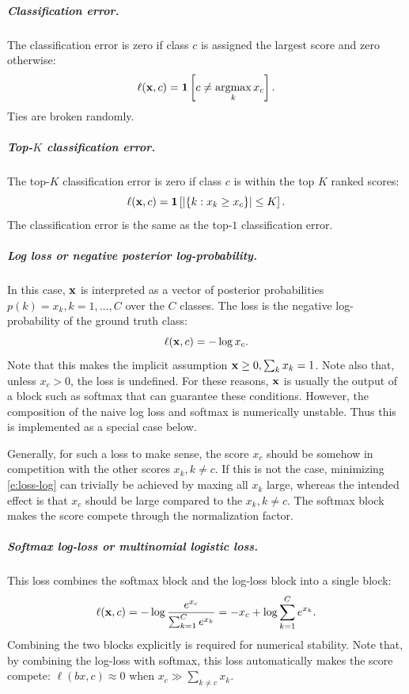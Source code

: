 \subparagraph{Classification error.} The classification error is zero if class $c$ is assigned the largest score and zero otherwise:
\begin{equation}\label{e:loss-classerror}
\ell(\bx,c) = \mathbf{1}\left[c \not= \argmax_k x_c\right].
\end{equation}
Ties are broken randomly.

\subparagraph{Top-$K$ classification error.} The top-$K$ classification error is zero if class $c$ is within the top $K$ ranked scores:
\begin{equation}\label{e:loss-classerror}
\ell(\mathbf{x},c) = \mathbf{1}\left[ |\{k : x_k \geq x_c \}| \leq K \right].
\end{equation}
The classification error is the same as the top-$1$ classification error.

\subparagraph{Log loss or negative posterior log-probability.} In this case, $\mathbf{x}$ is interpreted as a vector of posterior probabilities $p(k) = x_k, k=1,\dots, C$ over the $C$ classes. The loss is the negative log-probability of the ground truth class:
\begin{equation}\label{e:loss-log}
\ell(\mathbf{x}, c) = - \log x_c.
\end{equation}
Note that this makes the implicit assumption $\mathbf{x} \geq 0, \sum_k x_k = 1$. Note also that, unless $x_c > 0$, the loss is undefined. For these reasons, $\mathbf{x}$ is usually the output of a block such as softmax that can guarantee these conditions. However, the composition of the naive log loss and softmax is numerically unstable. Thus this is implemented as a special case below.

Generally, for such a loss to make sense, the score $x_c$ should be somehow in competition with the other scores $x_k, k\not = c$. If this is not the case, minimizing \eqref{e:loss-log} can trivially be achieved by maxing all $x_k$ large, whereas the intended effect is that $x_c$ should be large compared to the $x_k, k\not=c$. The softmax block makes the score compete through the normalization factor.

\subparagraph{Softmax log-loss or multinomial logistic loss.} This loss combines the softmax block and the log-loss block into a single block:
\begin{equation}\label{e:loss-softmaxlog}
\ell(\mathbf{x}, c) = - \log \frac{e^{x_c}}{\sum_{k=1}^C e^{x_k}}
= - x_c + \log \sum_{k=1}^C e^{x_k}.
\end{equation}
Combining the two blocks explicitly is required for numerical stability. Note that, by combining the log-loss with softmax, this loss automatically makes the score compete: $\ell(bx,c) \approx 0$ when $x_c \gg \sum_{k\not= c} x_k$.

